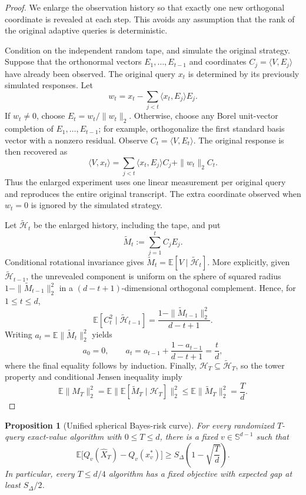 \documentclass[11pt]{article}
\newcommand{\E}{\mathbb{E}}
\newcommand{\Sph}{\mathbb{S}}
\theoremstyle{plain}
\newtheorem{proposition}[proposition]{Proposition}
\theoremstyle{definition}
\begin{document}
\begin{proof}
We enlarge the observation history so that exactly one new orthogonal
coordinate is revealed at each step.  This avoids any assumption that the
rank of the original adaptive queries is deterministic.

Condition on the independent random tape, and simulate the original
strategy.  Suppose that the orthonormal vectors $E_1,\ldots,E_{t-1}$ and
coordinates $C_j=\langle V,E_j\rangle$ have already been observed.  The
original query $x_t$ is determined by its previously simulated responses.
Let
\[
  w_t=x_t-\sum_{j<t}\langle x_t,E_j\rangle E_j.
\]
If $w_t\ne0$, choose $E_t=w_t/\|w_t\|_2$.  Otherwise, choose any Borel
unit-vector completion of $E_1,\ldots,E_{t-1}$; for example, orthogonalize
the first standard basis vector with a nonzero residual.  Observe
$C_t=\langle V,E_t\rangle$.  The original response is then recovered as
\[
  \langle V,x_t\rangle
  =\sum_{j<t}\langle x_t,E_j\rangle C_j+\|w_t\|_2 C_t.
\]
Thus the enlarged experiment uses one linear measurement per original
query and reproduces the entire original transcript.  The extra
coordinate observed when $w_t=0$ is ignored by the simulated strategy.

Let $\widetilde{\mathcal H}_t$ be the enlarged history, including the
tape, and put
\[
  \widetilde M_t:=\sum_{j=1}^t C_jE_j.
\]
Conditional rotational invariance gives
$\widetilde M_t=\mathbb E[V\mid\widetilde{\mathcal H}_t]$.
More explicitly, given $\widetilde{\mathcal H}_{t-1}$, the unrevealed
component is uniform on the sphere of squared radius
$1-\|\widetilde M_{t-1}\|_2^2$ in a $(d-t+1)$-dimensional orthogonal
complement.  Hence, for $1\le t\le d$,
\[
  \mathbb E[C_t^2\mid\widetilde{\mathcal H}_{t-1}]
  =\frac{1-\|\widetilde M_{t-1}\|_2^2}{d-t+1}.
\]
Writing $a_t=\mathbb E\|\widetilde M_t\|_2^2$ yields
\[
  a_0=0,\qquad
  a_t=a_{t-1}+\frac{1-a_{t-1}}{d-t+1}=\frac{t}{d},
\]
where the final equality follows by induction.  Finally,
$\mathcal H_T\subseteq\widetilde{\mathcal H}_T$, so the tower property
and conditional Jensen inequality imply
\[
  \mathbb E\|M_T\|_2^2
  =\mathbb E\bigl\|
      \mathbb E[\widetilde M_T\mid\mathcal H_T]
    \bigr\|_2^2
  \le\mathbb E\|\widetilde M_T\|_2^2
  =\frac{T}{d}.
\]
\end{proof}

\begin{proposition}[Unified spherical Bayes-risk curve]\label{prop:spherical-expected}
For every randomized $T$-query exact-value algorithm with $0\le T\le d$, there is a fixed $v\in\Sph^{d-1}$ such that
\begin{equation}\label{eq:spherical-Bayes}
   \E\bigl[Q_v(\widehat X_T)-Q_v(x_v^*)\bigr]
   \ge S_\Delta\left(1-\sqrt{\frac{T}{d}}\right).
\end{equation}
In particular, every $T\le d/4$ algorithm has a fixed objective with expected gap at least $S_\Delta/2$.
\end{proposition}
\end{document}
